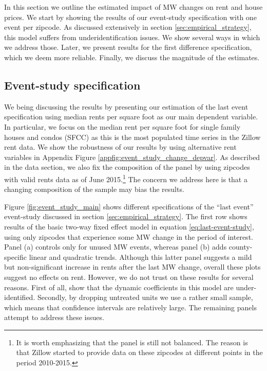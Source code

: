 
    In this section we outline the estimated impact of MW changes on rent and house prices. We start by showing the results of our event-study specification with one event per zipcode. As discussed extensively in section \autoref{sec:empirical_strategy}, this model suffers from underidentification issues. We show several ways in which we address those. Later, we present results for the first difference specification, which we deem more reliable. Finally, we discuss the magnitude of the estimates.


\subsection{Event-study specification}\label{subsec:results/event-study}

    We being discussing the results by presenting our estimation of the last event specification using median rents per square foot as our main dependent variable. In particular, we focus on the median rent per square foot for single family houses and condos (SFCC) as this is the most populated time series in the Zillow rent data. We show the robustness of our results by using alternative rent variables in Appendix Figure \ref{appfig:event_study_change_depvar}.
    As described in the data section, we also fix the composition of the panel by using zipcodes with valid rents data as of June 2015.\footnote{It is worth emphasizing that the panel is still not balanced. The reason is that Zillow started to provide data on these zipcodes at different points in the period 2010-2015.} The concern we address here is that a changing composition of the sample may bias the results.
    
    Figure \ref{fig:event_study_main} shows different specifications of the ``last event'' event-study discussed in section \ref{sec:empirical_strategy}. The first row shows results of the basic two-way fixed effect model in equation \eqref{eq:last-event-study}, using only zipcodes that experience some MW change in the period of interest. Panel (a) controls only for unused MW events, whereas panel (b) adds county-specific linear and quadratic trends. Although this latter panel suggests a mild but non-significant increase in rents after the last MW change, overall these plots suggest no effects on rent. However, we do not trust on these results for several reasons. First of all, \textcite{BorusyakJaravel2017} show that the dynamic coefficients in this model are under-identified. Secondly, by dropping untreated units we use a rather small sample, which means that confidence intervals are relatively large. The remaining panels attempt to address these issues.
    

